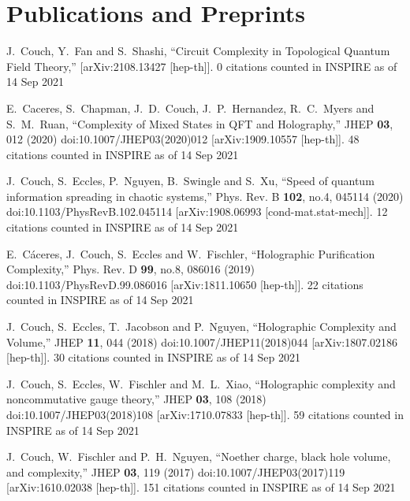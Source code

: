 \documentclass[letterpaper]{article}
\renewenvironment{itemize}{
  \begin{list}{}{
    \setlength{\leftmargin}{1.5em}
  }
}{
  \end{list}
}
\begin{document}
\section*{Publications and Preprints}
\begin{itemize}

\item
    J.~Couch, Y.~Fan and S.~Shashi,
    ``Circuit Complexity in Topological Quantum Field Theory,''
    [arXiv:2108.13427 [hep-th]].
    0 citations counted in INSPIRE as of 14 Sep 2021
  
\item
  E.~Caceres, S.~Chapman, J.~D.~Couch, J.~P.~Hernandez, R.~C.~Myers and S.~M.~Ruan,
  ``Complexity of Mixed States in QFT and Holography,''
  JHEP \textbf{03}, 012 (2020)
  doi:10.1007/JHEP03(2020)012
  [arXiv:1909.10557 [hep-th]].
  48 citations counted in INSPIRE as of 14 Sep 2021

\item
  J.~Couch, S.~Eccles, P.~Nguyen, B.~Swingle and S.~Xu,
  ``Speed of quantum information spreading in chaotic systems,''
  Phys. Rev. B \textbf{102}, no.4, 045114 (2020)
  doi:10.1103/PhysRevB.102.045114
  [arXiv:1908.06993 [cond-mat.stat-mech]].
  12 citations counted in INSPIRE as of 14 Sep 2021

\item 
  E.~C\'aceres, J.~Couch, S.~Eccles and W.~Fischler,
  ``Holographic Purification Complexity,''
  Phys. Rev. D \textbf{99}, no.8, 086016 (2019)
  doi:10.1103/PhysRevD.99.086016
  [arXiv:1811.10650 [hep-th]].
  22 citations counted in INSPIRE as of 14 Sep 2021

\item 
  J.~Couch, S.~Eccles, T.~Jacobson and P.~Nguyen,
  ``Holographic Complexity and Volume,''
  JHEP \textbf{11}, 044 (2018)
  doi:10.1007/JHEP11(2018)044
  [arXiv:1807.02186 [hep-th]].
  30 citations counted in INSPIRE as of 14 Sep 2021
  
\item
  J.~Couch, S.~Eccles, W.~Fischler and M.~L.~Xiao,
  ``Holographic complexity and noncommutative gauge theory,''
  JHEP \textbf{03}, 108 (2018)
  doi:10.1007/JHEP03(2018)108
  [arXiv:1710.07833 [hep-th]].
  59 citations counted in INSPIRE as of 14 Sep 2021

\item  
  J.~Couch, W.~Fischler and P.~H.~Nguyen,
  ``Noether charge, black hole volume, and complexity,''
  JHEP \textbf{03}, 119 (2017)
  doi:10.1007/JHEP03(2017)119
  [arXiv:1610.02038 [hep-th]].
  151 citations counted in INSPIRE as of 14 Sep 2021

  
\end{itemize}
\end{document}
